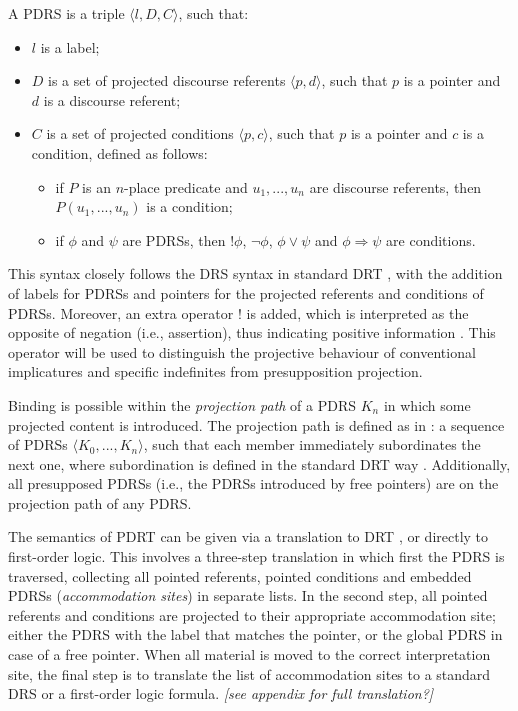 \begin{definition}[PDRS] A PDRS is a triple $\langle l, D, C\rangle$, such that:
  \begin{itemize}
    \item $l$ is a label;
    \item $D$ is a set of projected discourse referents $\langle p,d\rangle$, 
      such that $p$ is a pointer and $d$ is a discourse referent;
    \item $C$ is a set of projected conditions $\langle p, c\rangle$, such 
      that $p$ is a pointer and $c$ is a condition, defined as follows:
      \begin{itemize}
        \item if $P$ is an $n$-place predicate and $u_1,...,u_n$ are discourse
          referents, then $P(u_1,...,u_n)$ is a condition;
        \item if $\phi$ and $\psi$ are PDRSs, then $!\phi$, $\neg \phi$,
          $\phi \vee \psi$ and $\phi \Rightarrow \psi$ are conditions.
      \end{itemize}
  \end{itemize}
\end{definition}

\noindent This syntax closely follows the DRS syntax in standard DRT
\citep{kamp1993discourse}, with the addition of labels for PDRSs and
pointers for the projected referents and conditions of PDRSs. Moreover, an
extra operator $!$ is added, which is interpreted as the opposite of
negation (i.e., assertion), thus indicating positive information
\citep[cf.][]{bos2009controlled}. This operator will be used to distinguish
the projective behaviour of conventional implicatures and specific
indefinites from presupposition projection.

Binding is possible within the \emph{projection
path} of a PDRS $K_n$ in which some projected content is introduced. The
projection path is defined as in \citet{sandt1992presupposition}: a sequence
of PDRSs $\langle K_0,...,K_n\rangle$, such that each member immediately
subordinates the next one, where subordination is defined in the standard
DRT way \citep[cf.][]{kamp1993discourse}. Additionally, all presupposed
PDRSs (i.e., the PDRSs introduced by free pointers) are on the projection
path of any PDRS. 

The semantics of PDRT can be given via a translation to DRT
\citep[see][]{venhuizen2013pdrt}, or directly to first-order logic.  This
involves a three-step translation in which first the PDRS is traversed,
collecting all pointed referents, pointed conditions and embedded PDRSs
(\emph{accommodation sites}) in separate lists. In the second step, all
pointed referents and conditions are projected to their appropriate
accommodation site; either the PDRS with the label that matches the pointer,
or the global PDRS in case of a free pointer.  When all material is moved to
the correct interpretation site, the final step is to translate the list of
accommodation sites to a standard DRS or a first-order logic formula.
\emph{[see appendix for full translation?]}

